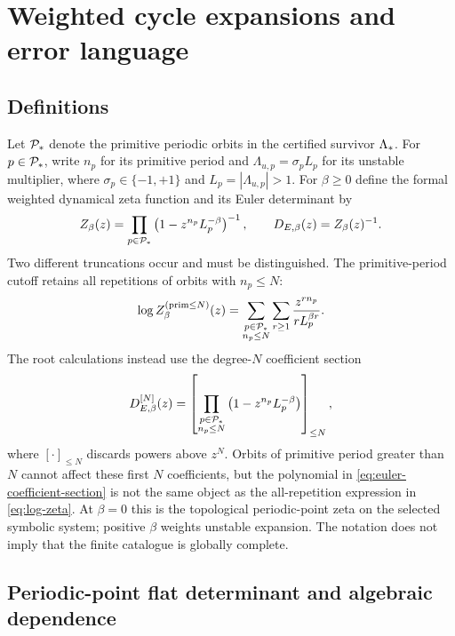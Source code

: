 \section{Weighted cycle expansions and error language}
\label{sec:zeta}

\subsection{Definitions}

Let $\mathcal{P}_*$ denote the primitive periodic orbits in the certified survivor
$\Lambda_*$.  For $p\in\mathcal{P}_*$, write $n_p$ for its primitive period and
$\Lambda_{u,p}=\sigma_pL_p$ for its unstable multiplier, where
$\sigma_p\in\{-1,+1\}$ and $L_p=|\Lambda_{u,p}|>1$.  For $\beta\geq0$ define
the formal weighted dynamical zeta function and its Euler determinant by
\begin{equation}
 Z_\beta(z)=
 \prod_{p\in\mathcal{P}_*}\left(1-z^{n_p}L_p^{-\beta}\right)^{-1},
 \qquad
 D_{E,\beta}(z)=Z_\beta(z)^{-1}.
 \label{eq:zeta}
\end{equation}
Two different truncations occur and must be distinguished.  The
primitive-period cutoff retains all repetitions of orbits with $n_p\leq N$:
\begin{equation}
 \log Z_\beta^{(\mathrm{prim}\leq N)}(z)=
 \sum_{\substack{p\in\mathcal{P}_*\\n_p\leq N}}
 \sum_{r\geq1}
 \frac{z^{r n_p}}{rL_p^{\beta r}}.
 \label{eq:log-zeta}
\end{equation}
The root calculations instead use the degree-$N$ coefficient section
\begin{equation}
 D_{E,\beta}^{[N]}(z)=
 \left[\prod_{\substack{p\in\mathcal{P}_*\\n_p\leq N}}
 \left(1-z^{n_p}L_p^{-\beta}\right)\right]_{\leq N},
 \label{eq:euler-coefficient-section}
\end{equation}
where $[\cdot]_{\leq N}$ discards powers above $z^N$.  Orbits of primitive
period greater than $N$ cannot affect these first $N$ coefficients, but the
polynomial in \eqref{eq:euler-coefficient-section} is not the same object as
the all-repetition expression in \eqref{eq:log-zeta}.
At $\beta=0$ this is the topological periodic-point zeta on the selected
symbolic system; positive $\beta$ weights unstable expansion.  The notation
does not imply that the finite catalogue is globally complete.

\subsection{Periodic-point flat determinant and algebraic dependence}

